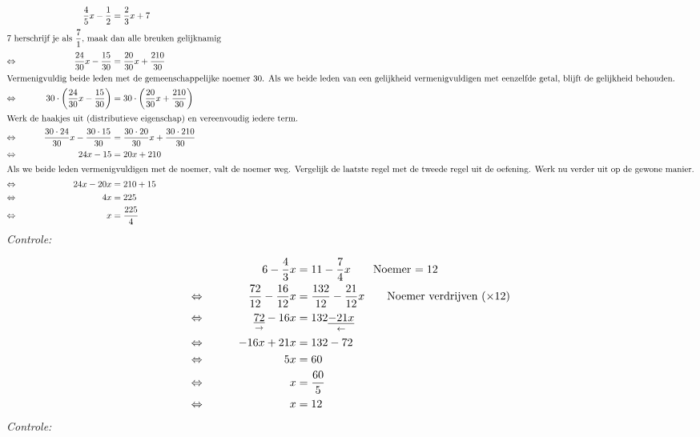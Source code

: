 \documentclass{bis}
\begin{document}
\begin{voorbeeld}
\begin{alignat*}{2}
     && \dfrac{4}{5}x-\dfrac{1}{2}&=\dfrac{2}{3}x+7\\
\intertext{7 herschrijf je als $\dfrac{7}{1}$, maak dan alle breuken gelijknamig}
\Leftrightarrow\mkern40mu && \dfrac{24}{30}x-\dfrac{15}{30}&=\dfrac{20}{30}x+\dfrac{210}{30}\\
\intertext{Vermenigvuldig beide leden met de gemeenschappelijke noemer 30.
	Als we beide leden van een gelijkheid vermenigvuldigen met eenzelfde getal, blijft de gelijkheid behouden.}
\Leftrightarrow\mkern40mu && 30\cdot\left(\dfrac{24}{30}x-\dfrac{15}{30}\right)&=30\cdot\left(\dfrac{20}{30}x+\dfrac{210}{30}\right)\\
\intertext{Werk de haakjes uit (distributieve eigenschap) en vereenvoudig iedere term.}
\Leftrightarrow\mkern40mu && \dfrac{30\cdot24}{30}x-\dfrac{30\cdot15}{30}&=\dfrac{30\cdot20}{30}x+\dfrac{30\cdot210}{30}\\
\Leftrightarrow\mkern40mu && 24x-15 &= 20x+210 \\
\intertext{Als we beide leden vermenigvuldigen met de noemer, valt de noemer weg.
	Vergelijk de laatste regel met de tweede regel uit de oefening.
	Werk nu verder uit op de gewone manier.}
\Leftrightarrow\mkern40mu && 24x-20x &= 210+15 \\
\Leftrightarrow\mkern40mu && 4x &= 225 \\
\Leftrightarrow\mkern40mu && x &= \dfrac{225}{4}
\end{alignat*}
{\em Controle: }\\
\end{voorbeeld}

\begin{voorbeeld}
\begin{alignat*}{2}
     && 6-\dfrac{4}{3}x &= 11-\dfrac{7}{4}x \qquad\text{Noemer $= 12$}\\
\Leftrightarrow\mkern40mu && \dfrac{72}{12}-\dfrac{16}{12}x &= \dfrac{132}{12}-\dfrac{21}{12}x \qquad\text{Noemer verdrijven ($\times 12$)}\\
\Leftrightarrow\mkern40mu && \underset{\rightarrow}{\underline{72}}-16x&=132\underset{\leftarrow}{\underline{-21x}}\\
\Leftrightarrow\mkern40mu && - 16x + 21x	&= 132 - 72\\
\Leftrightarrow\mkern40mu && 5x	&= 60\\
\Leftrightarrow\mkern40mu && x	&= \dfrac{60}{5}\\
\Leftrightarrow\mkern40mu && x	&= 12
\end{alignat*}
{\em Controle: }\\
\end{voorbeeld}
\end{document}
